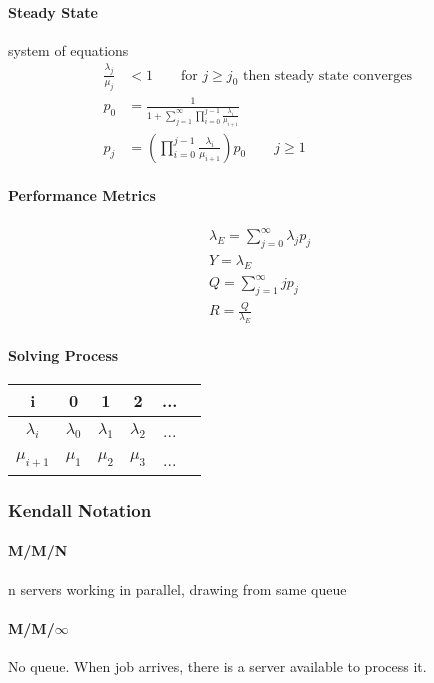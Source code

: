 \paragraph{Steady State} system of equations
\begin{align*}
	\frac{\lambda_j}{\mu_j} &< 1 \qquad \mbox{for } j \ge j_0  \mbox{ then steady state converges }\\
	p_0 &= \frac{1}{1 + \sum_{j=1}^\infty \prod_{i=0}^{j-1} \frac{\lambda_i}{\mu_{i+1}}} \\
	p_j &= \left ( \prod_{i=0}^{j-1} \frac{\lambda_{i}}{\mu_{i+1}} \right ) p_0 \qquad j \ge 1
\end{align*}

\paragraph{Performance Metrics}
\begin{align*}
	\lambda_E = \sum_{j=0}^\infty \lambda_j p_j \\
	Y = \lambda_E \\
	Q = \sum_{j=1}^\infty j p_j \\
	R = \frac{Q}{\lambda_E}
\end{align*}

\paragraph{Solving Process}
\begin{tabular}{ c | c c c c c}
	i           & 0           & 1           & 2           & ...\\
	\hline
	$\lambda_i$ & $\lambda_0$ & $\lambda_1$ & $\lambda_2$ & ... \\
	$\mu_{i+1}$ & $\mu_1$     & $\mu_2$     &  $\mu_3$    & ... \\
\end{tabular}

\subsubsection{Kendall Notation}
\paragraph{M/M/N} n servers working in parallel, drawing from same queue
\paragraph{M/M/$\infty$} No queue. When job arrives, there is a server available
to process it.

